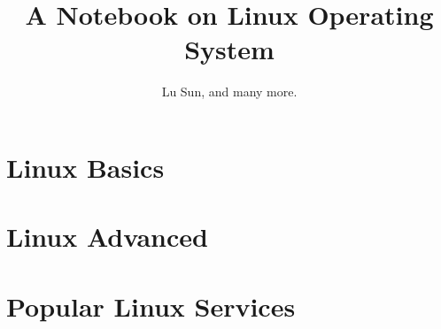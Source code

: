 

\makeindex



\frontmatter

\title{A Notebook on Linux Operating System}
\author{Lu Sun, and many more.}

\maketitle


\tableofcontents


\listoffigures
\listoftables

\mainmatter

\part{Linux Basics}













\part{Linux Advanced}







\part{Popular Linux Services}

 







